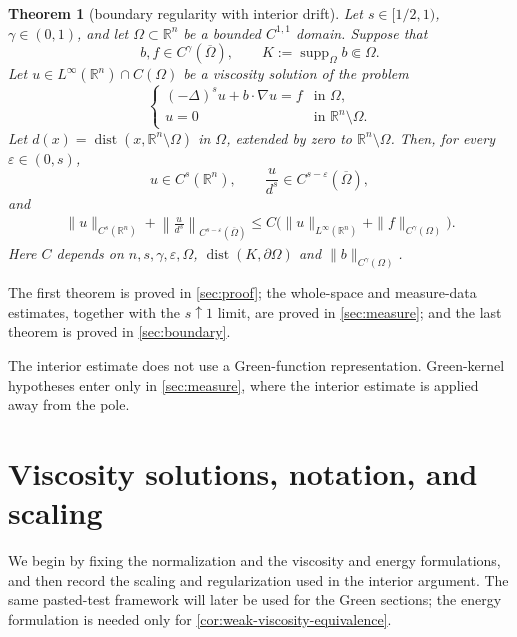 \documentclass[10pt,a4paper]{amsart}
\numberwithin{equation}{section}
\newtheorem{theorem}{Theorem}[section]
\newcommand{\R}{\mathbb R}
\newcommand{\rev}[1]{#1}
\begin{document}
\begin{theorem}[boundary regularity with interior drift]\label{thm:boundary-drift}
Let $s\in[1/2,1)$, $\gamma\in(0,1)$, and let $\Omega\subset\R^n$ be a
bounded $C^{1,1}$ domain.  Suppose that
\[
 b,f\in C^\gamma(\overline\Omega),
 \qquad K:=\operatorname{supp}_{\Omega}b\Subset\Omega.
\]
Let $u\in L^\infty(\R^n)\cap C(\Omega)$ be a viscosity solution of
the problem
\begin{equation}\label{eq:dirichlet-drift}
 \begin{cases}
 (-\Delta)^su+b\cdot\nabla u=f&\text{in }\Omega,\\
 u=0&\text{in }\R^n\setminus\Omega.
 \end{cases}
\end{equation}
Let $d(x)=\operatorname{dist}(x,\R^n\setminus\Omega)$ in $\Omega$, extended
by zero to $\R^n\setminus\Omega$.  Then, for every
$\varepsilon\in(0,s)$,
\begin{equation}\label{eq:boundary-drift-estimate}
 u\in C^s(\R^n),
 \qquad \frac{u}{d^s}\in
 C^{s-\varepsilon}(\overline\Omega),
\end{equation}
and
\begin{align}\label{eq:boundary-drift-norm}
 \|u\|_{C^s(\R^n)}
 +\left\|\frac{u}{d^s}\right\|_{C^{s-\varepsilon}(\overline\Omega)}\le C\bigl(
 \|u\|_{L^\infty(\R^n)}+
 \|f\|_{C^\gamma(\Omega)}\bigr).
\end{align}
Here $C$ depends on $n,s,\gamma,\varepsilon,\Omega$,
$\operatorname{dist}(K,\partial\Omega)$ and
$\|b\|_{C^\gamma(\Omega)}$.
\end{theorem}

The first theorem is proved in \cref{sec:proof}; the whole-space and
measure-data estimates, together with the $s\uparrow1$ limit, are proved in
\cref{sec:measure}; and the last theorem is proved in \cref{sec:boundary}.

\rev{The interior estimate does not use a Green-function representation.
Green-kernel hypotheses enter only in \cref{sec:measure}, where the interior
estimate is applied away from the pole.}

\section{Viscosity solutions, notation, and scaling}
\label{sec:preliminaries}

\rev{We begin by fixing the normalization and the viscosity and energy
formulations, and then record the scaling and regularization used in the
interior argument.  The same pasted-test framework will later be used for
the Green sections; the energy formulation is needed only for
\cref{cor:weak-viscosity-equivalence}.}
\end{document}
